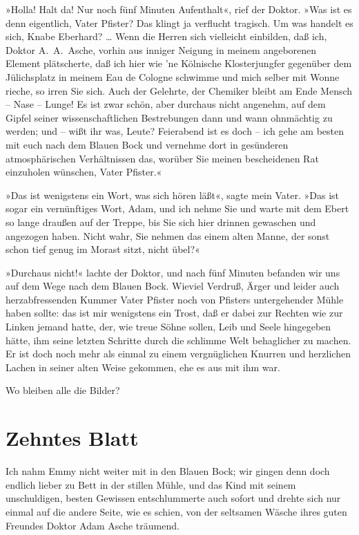»Holla! Halt da! Nur noch fünf Minuten Aufenthalt«, rief der
Doktor. »Was ist es denn eigentlich, Vater Pfister? Das klingt ja
verflucht tragisch. Um was handelt es sich, Knabe Eberhard? \ldots{}
Wenn die Herren sich vielleicht einbilden, daß ich, Doktor
A.~A.~Asche, vorhin aus inniger Neigung in meinem angeborenen
Element plätscherte, daß ich hier wie 'ne Kölnische Klosterjungfer
gegenüber dem Jülichsplatz in meinem Eau de Cologne schwimme und
mich selber mit Wonne rieche, so irren Sie sich. Auch der Gelehrte,
der Chemiker bleibt am Ende Mensch – Nase – Lunge! Es ist zwar
schön, aber durchaus nicht angenehm, auf dem Gipfel seiner
wissenschaftlichen Bestrebungen dann und wann ohnmächtig zu werden;
und – wißt ihr was, Leute? Feierabend ist es doch – ich gehe am
besten mit euch nach dem Blauen Bock und vernehme dort in
gesünderen atmosphärischen Verhältnissen das, worüber Sie meinen
bescheidenen Rat einzuholen wünschen, Vater Pfister.«

»Das ist wenigstens ein Wort, was sich hören läßt«, sagte mein
Vater. »Das ist sogar ein vernünftiges Wort, Adam, und ich nehme
Sie und warte mit dem Ebert so lange draußen auf der Treppe, bis
Sie sich hier drinnen gewaschen und angezogen haben. Nicht wahr,
Sie nehmen das einem alten Manne, der sonst schon tief genug im
Morast sitzt, nicht übel?«

»Durchaus nicht!« lachte der Doktor, und nach fünf Minuten befanden
wir uns auf dem Wege nach dem Blauen Bock. Wieviel Verdruß, Ärger
und leider auch herzabfressenden Kummer Vater Pfister noch von
Pfisters untergehender Mühle haben sollte: das ist mir wenigstens
ein Trost, daß er dabei zur Rechten wie zur Linken jemand hatte,
der, wie treue Söhne sollen, Leib und Seele hingegeben hätte, ihm
seine letzten Schritte durch die schlimme Welt behaglicher zu
machen. Er ist doch noch mehr als einmal zu einem vergnüglichen
Knurren und herzlichen Lachen in seiner alten Weise gekommen, ehe
es aus mit ihm war.

Wo bleiben alle die Bilder?

\section{Zehntes Blatt}

Ich nahm Emmy nicht weiter mit in den Blauen Bock; wir gingen denn
doch endlich lieber zu Bett in der stillen Mühle, und das Kind mit
seinem unschuldigen, besten Gewissen entschlummerte auch sofort und
drehte sich nur einmal auf die andere Seite, wie es schien, von der
seltsamen Wäsche ihres guten Freundes Doktor Adam Asche träumend.

